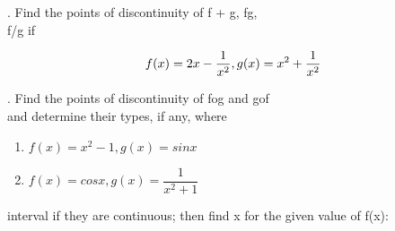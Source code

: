 \documentclass[11pt]{amsbook}
\begin{document}
. Find the points of discontinuity of f + g, fg,
\\f/g if

\begin{equation*}
f(x) = 2x - \dfrac{1}{x^2}, g(x)=x^2+\dfrac{1}{x^2}\\
\end{equation*}

. Find the points of discontinuity of fog and gof 
\\and determine their types, if any, where

\begin{enumerate}
\renewcommand{\labelenumi}{\alph{enumi})}
\item $f(x) = x^2-1, g(x) = sinx$
\item $f(x) = cosx, g(x) = \dfrac{1}{x^2+1}$\\
\end{enumerate}
interval if they are continuous; then find x for the given value of f(x): \\
%
\end{document}
